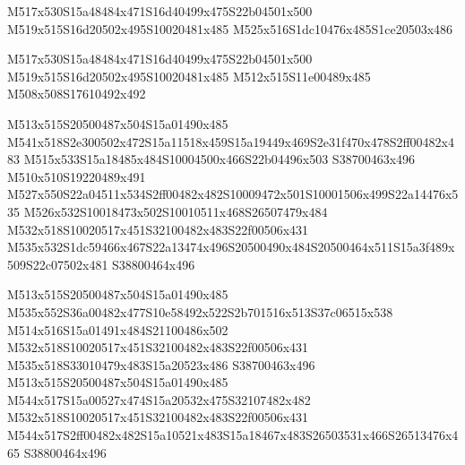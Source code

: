 \documentclass{article}
\begin{document}
\begin{multicols}{2}

\begin{center}
M517x530S15a48484x471S16d40499x475S22b04501x500 M519x515S16d20502x495S10020481x485 M525x516S1dc10476x485S1ce20503x486 
\end{center}










\begin{center}
M517x530S15a48484x471S16d40499x475S22b04501x500 M519x515S16d20502x495S10020481x485 M512x515S11e00489x485 M508x508S17610492x492 
\end{center}


M513x515S20500487x504S15a01490x485 M541x518S2e300502x472S15a11518x459S15a19449x469S2e31f470x478S2ff00482x483 M515x533S15a18485x484S10004500x466S22b04496x503 S38700463x496 M510x510S19220489x491 M527x550S22a04511x534S2ff00482x482S10009472x501S10001506x499S22a14476x535 M526x532S10018473x502S10010511x468S26507479x484 M532x518S10020517x451S32100482x483S22f00506x431 M535x532S1dc59466x467S22a13474x496S20500490x484S20500464x511S15a3f489x509S22c07502x481 S38800464x496

M513x515S20500487x504S15a01490x485 M535x552S36a00482x477S10e58492x522S2b701516x513S37c06515x538 M514x516S15a01491x484S21100486x502 M532x518S10020517x451S32100482x483S22f00506x431 M535x518S33010479x483S15a20523x486 S38700463x496 M513x515S20500487x504S15a01490x485 M544x517S15a00527x474S15a20532x475S32107482x482 M532x518S10020517x451S32100482x483S22f00506x431 M544x517S2ff00482x482S15a10521x483S15a18467x483S26503531x466S26513476x465 S38800464x496


\end{multicols}
\end{document}
